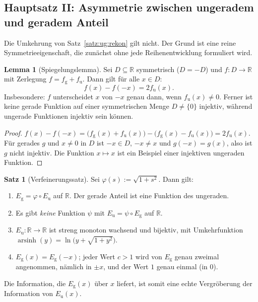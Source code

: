 \documentclass[a4paper,12pt,twoside]{report}
\theoremstyle{definition}
\newtheorem{satz}{Satz}
\newtheorem{lemma}{Lemma}
\begin{document}
\subsection{Hauptsatz II: Asymmetrie zwischen ungeradem und geradem Anteil}
\label{sec:ug:haupt2}

Die Umkehrung von Satz~\ref{satz:ug:rekon} gilt nicht. Der Grund ist eine reine Symmetrieeigenschaft, die zunächst ohne jede Reihenentwicklung formuliert wird.

\begin{lemma}[Spiegelungslemma]\label{lem:ug:spiegel}
Sei $D\subseteq\mathbb{R}$ symmetrisch ($D=-D$) und $f:D\to\mathbb{R}$ mit Zerlegung $f=f_{\mathrm g}+f_{\mathrm u}$. Dann gilt für alle $x\in D$:
\[
f(x)-f(-x)=2f_{\mathrm u}(x).
\]
Insbesondere: $f$ unterscheidet $x$ von $-x$ genau dann, wenn $f_{\mathrm u}(x)\neq0$. Ferner ist keine gerade Funktion auf einer symmetrischen Menge $D\ne\{0\}$ injektiv, während ungerade Funktionen injektiv sein können.
\end{lemma}

\begin{proof}
$f(x)-f(-x)=\big(f_{\mathrm g}(x)+f_{\mathrm u}(x)\big)-\big(f_{\mathrm g}(x)-f_{\mathrm u}(x)\big)=2f_{\mathrm u}(x)$. Für gerades $g$ und $x\ne0$ in $D$ ist $-x\in D$, $-x\ne x$ und $g(-x)=g(x)$, also ist $g$ nicht injektiv. Die Funktion $x\mapsto x$ ist ein Beispiel einer injektiven ungeraden Funktion.
\end{proof}

\begin{satz}[Verfeinerungssatz]\label{satz:ug:verfein}
Sei $\varphi(s):=\sqrt{1+s^2}$. Dann gilt:
\begin{enumerate}[label=(\alph*)]
\item $E_{\mathrm g}=\varphi\circ E_{\mathrm u}$ auf $\mathbb{R}$. Der gerade Anteil ist eine Funktion des ungeraden.
\item Es gibt \emph{keine} Funktion $\psi$ mit $E_{\mathrm u}=\psi\circ E_{\mathrm g}$ auf $\mathbb{R}$.
\item $E_{\mathrm u}:\mathbb{R}\to\mathbb{R}$ ist streng monoton wachsend und bijektiv, mit Umkehrfunktion $\operatorname{arsinh}(y)=\ln\!\big(y+\sqrt{1+y^2}\big)$.
\item $E_{\mathrm g}(x)=E_{\mathrm g}(-x)$; jeder Wert $c>1$ wird von $E_{\mathrm g}$ genau zweimal angenommen, nämlich in $\pm x$, und der Wert $1$ genau einmal (in $0$).
\end{enumerate}
Die Information, die $E_{\mathrm g}(x)$ über $x$ liefert, ist somit eine echte Vergröberung der Information von $E_{\mathrm u}(x)$.
\end{satz}
\end{document}
